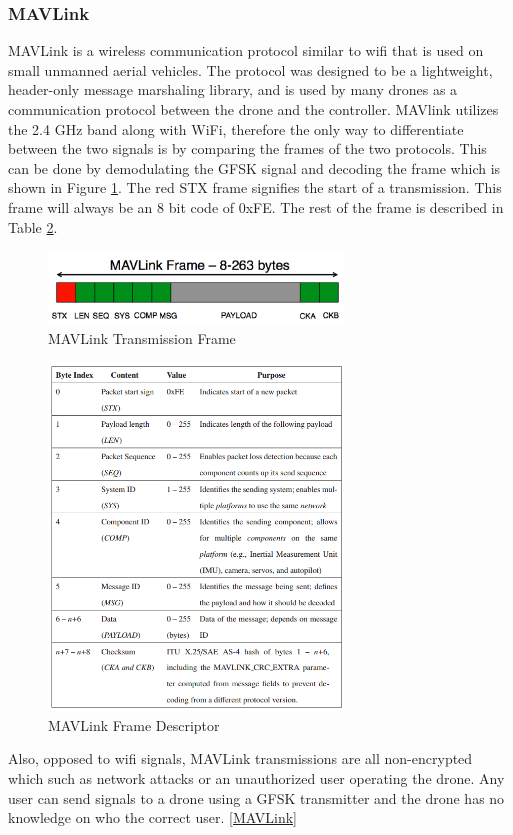 \subsubsection{MAVLink}
MAVLink is a wireless communication protocol similar to wifi that is used on small unmanned aerial vehicles. The protocol was designed to be a lightweight, header-only message marshaling library, and is used by many drones as a communication protocol between the drone and the controller. MAVlink utilizes the 2.4 GHz band along with WiFi, therefore the only way to differentiate between the two signals is by comparing the frames of the two protocols. This can be done by demodulating the GFSK signal and decoding the frame which is shown in Figure \ref{fig:MAVlink_frame}. The red STX frame signifies the start of a transmission. This frame will always be an 8 bit code of 0xFE. The rest of the frame is described in Table \ref{fig:MAVlink_frame_table}.
\begin{figure}[ht]
\centering
\includegraphics[width=0.70\textwidth]{img/mavlink-packet.png}
\caption{MAVLink Transmission Frame}
\label{fig:MAVlink_frame}
\end{figure}
\begin{figure}[ht]
\centering
\includegraphics[width=0.70\textwidth]{img/MAVLink-Packet-Table.png}
\caption{MAVLink Frame Descriptor}
\label{fig:MAVlink_frame_table}
\end{figure}
\cite{mavlink_vuln}\par
Also, opposed to wifi signals, MAVLink transmissions are all non-encrypted which such as network attacks or an unauthorized user operating the drone. Any user can send signals to a drone using a GFSK transmitter and the drone has no knowledge on who the correct user. \ref{MAVLink}

